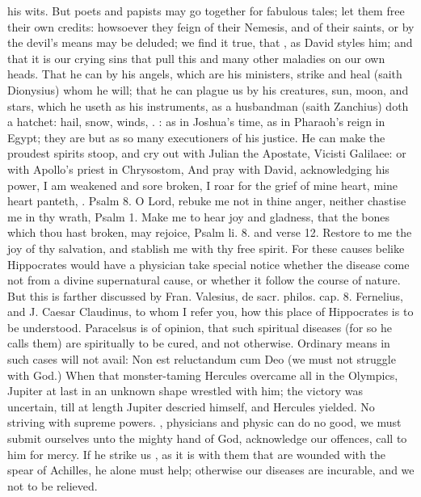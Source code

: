 {{his wits. But poets and papists may go together for fabulous tales; let
them free their own credits: howsoever they feign of their Nemesis, and
of their saints, or by the devil's means may be deluded; we find it
true, that , as David
styles him; and that it is our crying sins that pull this and many
other maladies on our own heads. That he can by his angels, which are
his ministers, strike and heal (saith Dionysius) whom he will;
that he can plague us by his creatures, sun, moon, and stars, which he
useth as his instruments, as a husbandman (saith Zanchius) doth a
hatchet: hail, snow, winds, \etc{}. : as in Joshua's time, as in Pharaoh's reign in Egypt; they are
but as so many executioners of his justice. He can make the proudest
spirits stoop, and cry out with Julian the Apostate, Vicisti Galilaee:
or with Apollo's priest in Chrysostom,  And pray with David, acknowledging
his power, I am weakened and sore broken, I roar for the grief of mine
heart, mine heart panteth, \etc{}. Psalm  8. O Lord, rebuke me not
in thine anger, neither chastise me in thy wrath, Psalm  1.
Make me to hear joy and gladness, that the bones which thou hast
broken, may rejoice, Psalm li. 8. and verse 12. Restore to me the joy
of thy salvation, and stablish me with thy free spirit. For these
causes belike Hippocrates would have a physician take special
notice whether the disease come not from a divine supernatural cause,
or whether it follow the course of nature. But this is farther
discussed by Fran. Valesius, de sacr. philos. cap. 8.  Fernelius,
and J. Caesar Claudinus, to whom I refer you, how this place of
Hippocrates is to be understood. Paracelsus is of opinion, that such
spiritual diseases (for so he calls them) are spiritually to be cured,
and not otherwise. Ordinary means in such cases will not avail: Non est
reluctandum cum Deo (we must not struggle with God.) When that
monster-taming Hercules overcame all in the Olympics, Jupiter at last
in an unknown shape wrestled with him; the victory was uncertain, till
at length Jupiter descried himself, and Hercules yielded. No striving
with supreme powers. ,
physicians and physic can do no good, we must submit ourselves
unto the mighty hand of God, acknowledge our offences, call to him for
mercy. If he strike us , as it
is with them that are wounded with the spear of Achilles, he alone must
help; otherwise our diseases are incurable, and we not to be relieved.

}}
